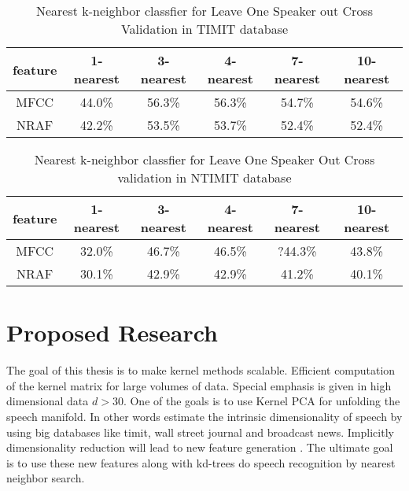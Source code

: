 \documentclass[12pt,letterpaper,doublespaced,ETD,dvips,proposal]{gtthesis}
\begin{document}
\begin{Body}
\begin{table}[htb]
\footnotesize{ \centering
\begin{tabular}{|c|c|c|c|c|c|}
  \hline
  feature & 1-nearest & 3-nearest & 4-nearest & 7-nearest & 10-nearest \\
  \hline
  MFCC & 44.0\% & 56.3\% & 56.3\% & 54.7\% & 54.6\% \\
  NRAF & 42.2\% & 53.5\% & 53.7\% & 52.4\% & 52.4\% \\
  \hline
\end{tabular}
\caption{Nearest k-neighbor classfier for
  Leave One Speaker out Cross Validation in TIMIT database}
} \label{kneighborLOOCVTIMIT}
\end{table}

\begin{table}[htb]
\footnotesize{ \centering
\begin{tabular}{|c|c|c|c|c|c|}
  \hline
  feature & 1-nearest & 3-nearest & 4-nearest & 7-nearest & 10-nearest \\
  \hline
  MFCC & 32.0\% & 46.7\% & 46.5\% & ?44.3\% & 43.8\% \\
  NRAF & 30.1\% & 42.9\% & 42.9\% & 41.2\% & 40.1\% \\
  \hline
\end{tabular}
  \caption{Nearest k-neighbor classfier for Leave One Speaker Out
  Cross validation in  NTIMIT database}
} \label{kneighborLOOCVNTIMIT}
\end{table}


\section{Proposed Research}
\label{proposed}

The goal of this thesis is to make kernel methods scalable.
Efficient computation of the kernel matrix for large volumes of
data. Special emphasis is given in high dimensional data $d>30$. One
of the goals is to use Kernel PCA for unfolding the speech manifold.
In other words estimate the intrinsic dimensionality of speech by
using big databases like timit, wall street journal and broadcast
news. Implicitly dimensionality reduction will lead to new feature
generation . The ultimate goal is to use these new features along
with kd-trees do speech recognition by nearest neighbor search.


\end{Body}
\end{document}

